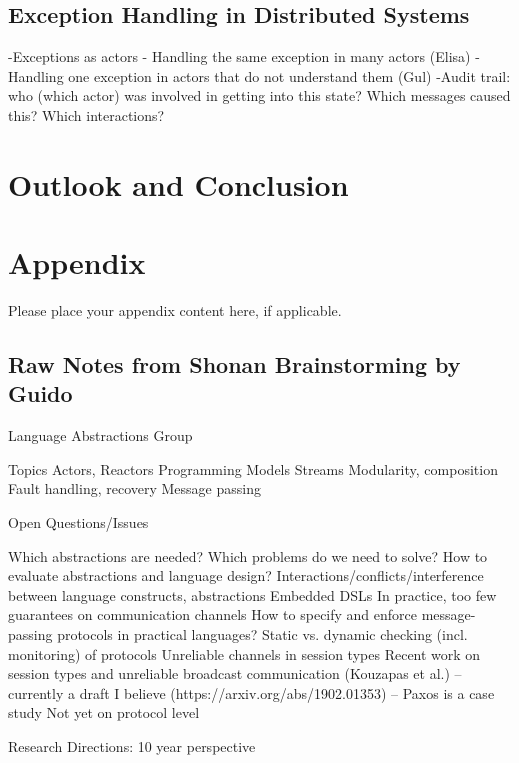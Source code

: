 \documentclass[
graybox,
envcountchap,
]{svmult}
\begin{document}
\begin{bibunit}
\subsection{Exception Handling in Distributed Systems}
\label{sub:sec:exc}

-Exceptions as actors
- Handling the same exception in many actors (Elisa)
- Handling one exception in actors that do not understand them (Gul)
-Audit trail: who (which actor) was involved in getting into this state? Which messages caused this? Which interactions?

\section{Outlook and Conclusion}
\label{sec:conc}
	
	
	\section*{Appendix}\label{appendix}
	
	Please place your appendix content here, if applicable.
	
	\subsection{Raw Notes from Shonan Brainstorming by Guido}
	
	Language Abstractions Group

Topics
Actors, Reactors
Programming Models
Streams
Modularity, composition
Fault handling, recovery
Message passing

Open Questions/Issues

Which abstractions are needed?
Which problems do we need to solve?
How to evaluate abstractions and language design?
Interactions/conflicts/interference between language constructs, abstractions
Embedded DSLs
In practice, too few guarantees on communication channels
How to specify and enforce message-passing protocols in practical languages?
Static vs. dynamic checking (incl. monitoring) of protocols
Unreliable channels in session types
Recent work on session types and unreliable broadcast communication (Kouzapas et al.) -- currently a draft I believe (https://arxiv.org/abs/1902.01353) -- Paxos is a case study
Not yet on protocol level


Research Directions: 10 year perspective



\end{bibunit}
\end{document}
